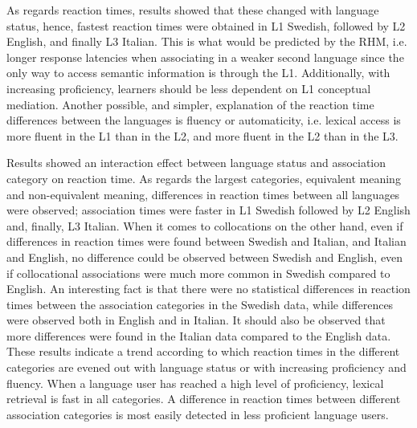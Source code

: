 \documentclass[output=paper,colorlinks,citecolor=brown,nonflat]{langsci/langscibook}
\begin{document}
As regards reaction times, results showed that these changed with language status, hence, fastest reaction times were obtained in L1 Swedish, followed by L2 English, and finally L3 Italian. This is what would be predicted by the RHM, i.e. longer response latencies when associating in a weaker second language since the only way to access semantic information is through the L1. Additionally, with increasing proficiency, learners should be less dependent on L1 conceptual mediation. Another possible, and simpler, explanation of the reaction time differences between the languages is fluency or automaticity, i.e. lexical access is more fluent in the L1 than in the L2, and more fluent in the L2 than in the L3.

Results showed an interaction effect between language status and association category on reaction time. As regards the largest categories, equivalent meaning and non-equivalent meaning, differences in reaction times between all languages were observed; association times were faster in L1 Swedish followed by L2 English and, finally, L3 Italian. When it comes to collocations on the other hand, even if differences in reaction times were found between Swedish and Italian, and Italian and English, no difference could be observed between Swedish and English, even if collocational associations were much more common in Swedish compared to English. An interesting fact is that there were no statistical differences in reaction times between the association categories in the Swedish data, while differences were observed both in English and in Italian. It should also be observed that more differences were found in the Italian data compared to the English data. These results indicate a trend according to which reaction times in the different categories are evened out with language status or with increasing proficiency and fluency. When a language user has reached a high level of proficiency, lexical retrieval is fast in all categories. A difference in reaction times between different association categories is most easily detected in less proficient language users.
\end{document}
